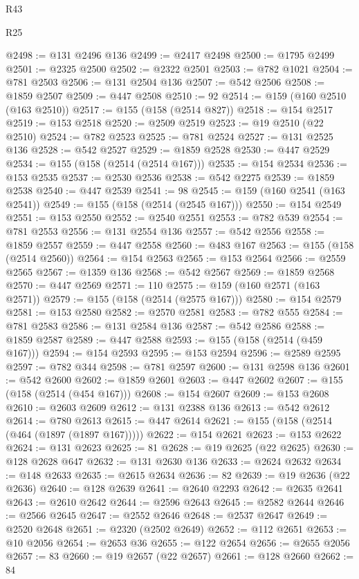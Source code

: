 \begin{lexlean}{R43}
\begin{lexlean}{R25}
\begin{coremodule}
{{{{{{{{{{{{{{{{{{{{{{{{{{{{{{{{{{{{{{{{{{{{{{{{{{{{{{{{{{{{{{{{{{{{{{{{{{{{{{{{{{{{{{{{{{{{{{{{{{{{{{{{{{{{{{{{{{{{{{{{{{{{{{{{{{{{{{{{{{{{{{{{{{{{{{{{{{{{{{{{{{{{{{{{{{{{{{{{{{{{{{{{{{{{{{{{{@2498 := @131 @2496 @136
@2499 := @2417 @2498
@2500 := @1795 @2499
@2501 := @2325 @2500
@2502 := @2322 @2501
@2503 := @782 @1021
@2504 := @781 @2503
@2506 := @131 @2504 @136
@2507 := @542 @2506
@2508 := @1859 @2507
@2509 := @447 @2508
@2510 := 92
@2514 := @159 (@160 @2510 (@163 @2510))
@2517 := @155 (@158 (@2514 @827))
@2518 := @154 @2517
@2519 := @153 @2518
@2520 := @2509 @2519
@2523 := @19 @2510 (@22 @2510)
@2524 := @782 @2523
@2525 := @781 @2524
@2527 := @131 @2525 @136
@2528 := @542 @2527
@2529 := @1859 @2528
@2530 := @447 @2529
@2534 := @155 (@158 (@2514 (@2514 @167)))
@2535 := @154 @2534
@2536 := @153 @2535
@2537 := @2530 @2536
@2538 := @542 @2275
@2539 := @1859 @2538
@2540 := @447 @2539
@2541 := 98
@2545 := @159 (@160 @2541 (@163 @2541))
@2549 := @155 (@158 (@2514 (@2545 @167)))
@2550 := @154 @2549
@2551 := @153 @2550
@2552 := @2540 @2551
@2553 := @782 @539
@2554 := @781 @2553
@2556 := @131 @2554 @136
@2557 := @542 @2556
@2558 := @1859 @2557
@2559 := @447 @2558
@2560 := @483 @167
@2563 := @155 (@158 (@2514 @2560))
@2564 := @154 @2563
@2565 := @153 @2564
@2566 := @2559 @2565
@2567 := @1359 @136
@2568 := @542 @2567
@2569 := @1859 @2568
@2570 := @447 @2569
@2571 := 110
@2575 := @159 (@160 @2571 (@163 @2571))
@2579 := @155 (@158 (@2514 (@2575 @167)))
@2580 := @154 @2579
@2581 := @153 @2580
@2582 := @2570 @2581
@2583 := @782 @555
@2584 := @781 @2583
@2586 := @131 @2584 @136
@2587 := @542 @2586
@2588 := @1859 @2587
@2589 := @447 @2588
@2593 := @155 (@158 (@2514 (@459 @167)))
@2594 := @154 @2593
@2595 := @153 @2594
@2596 := @2589 @2595
@2597 := @782 @344
@2598 := @781 @2597
@2600 := @131 @2598 @136
@2601 := @542 @2600
@2602 := @1859 @2601
@2603 := @447 @2602
@2607 := @155 (@158 (@2514 (@454 @167)))
@2608 := @154 @2607
@2609 := @153 @2608
@2610 := @2603 @2609
@2612 := @131 @2388 @136
@2613 := @542 @2612
@2614 := @780 @2613
@2615 := @447 @2614
@2621 := @155 (@158 (@2514 (@464 (@1897 (@1897 @167)))))
@2622 := @154 @2621
@2623 := @153 @2622
@2624 := @131 @2623
@2625 := 81
@2628 := @19 @2625 (@22 @2625)
@2630 := @128 @2628 @647
@2632 := @131 @2630 @136
@2633 := @2624 @2632
@2634 := @148 @2633
@2635 := @2615 @2634
@2636 := 82
@2639 := @19 @2636 (@22 @2636)
@2640 := @128 @2639
@2641 := @2640 @2293
@2642 := @2635 @2641
@2643 := @2610 @2642
@2644 := @2596 @2643
@2645 := @2582 @2644
@2646 := @2566 @2645
@2647 := @2552 @2646
@2648 := @2537 @2647
@2649 := @2520 @2648
@2651 := @2320 (@2502 @2649)
@2652 := @112 @2651
@2653 := @10 @2056
@2654 := @2653 @36
@2655 := @122 @2654
@2656 := @2655 @2056
@2657 := 83
@2660 := @19 @2657 (@22 @2657)
@2661 := @128 @2660
@2662 := 84
}}}}}}}}}}}}}}}}}}}}}}}}}}}}}}}}}}}}}}}}}}}}}}}}}}}}}}}}}}}}}}}}}}}}}}}}}}}}}}}}}}}}}}}}}}}}}}}}}}}}}}}}}}}}}}}}}}}}}}}}}}}}}}}}}}}}}}}}}}}}}}}}}}}}}}}}}}}}}}}}}}}}}}}}}}}}}}}}}}}}}}}}}}}}}}}}}
\end{coremodule}
\end{lexlean}
\end{lexlean}
